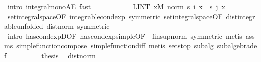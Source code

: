 \begin{isabellebody}
\ {\isacharparenleft}{\kern0pt}intro\ integral{\isacharunderscore}{\kern0pt}mono{\isacharunderscore}{\kern0pt}AE{\isacharcomma}{\kern0pt}\ fast{\isacharplus}{\kern0pt}{\isacharparenright}{\kern0pt}\isanewline
\ \ \ \ \ \ \isamarkupfalse%
\ \isamarkupfalse%
\ {\isachardoublequoteopen}{\isachardot}{\kern0pt}{\isachardot}{\kern0pt}{\isachardot}{\kern0pt}\ {\isacharequal}{\kern0pt}\ LINT\ x{\isacharbar}{\kern0pt}M{\isachardot}{\kern0pt}\ norm\ {\isacharparenleft}{\kern0pt}s\ i\ x\ {\isacharminus}{\kern0pt}\ s\ j\ x{\isacharparenright}{\kern0pt}{\isachardoublequoteclose}\ \isamarkupfalse%
\ set{\isacharunderscore}{\kern0pt}integral{\isacharunderscore}{\kern0pt}space{\isacharparenleft}{\kern0pt}{}{\isacharparenright}{\kern0pt}{\isacharbrackleft}{\kern0pt}OF\ integrable{\isacharunderscore}{\kern0pt}cond{\isacharunderscore}{\kern0pt}exp{\isacharcomma}{\kern0pt}\ symmetric{\isacharbrackright}{\kern0pt}\ set{\isacharunderscore}{\kern0pt}integral{\isacharunderscore}{\kern0pt}space{\isacharbrackleft}{\kern0pt}OF\ dist{\isacharunderscore}{\kern0pt}integrable{\isacharbrackleft}{\kern0pt}unfolded\ dist{\isacharunderscore}{\kern0pt}norm{\isacharbrackright}{\kern0pt}{\isacharcomma}{\kern0pt}\ symmetric{\isacharbrackright}{\kern0pt}\ \isamarkupfalse%
\ {\isacharparenleft}{\kern0pt}intro\ has{\isacharunderscore}{\kern0pt}cond{\isacharunderscore}{\kern0pt}expD{\isacharparenleft}{\kern0pt}{}{\isacharparenright}{\kern0pt}{\isacharbrackleft}{\kern0pt}OF\ has{\isacharunderscore}{\kern0pt}cond{\isacharunderscore}{\kern0pt}exp{\isacharunderscore}{\kern0pt}simple{\isacharbrackleft}{\kern0pt}OF\ {\isacharunderscore}{\kern0pt}\ fin{\isacharunderscore}{\kern0pt}sup{\isacharunderscore}{\kern0pt}norm{\isacharbrackright}{\kern0pt}{\isacharcomma}{\kern0pt}\ symmetric{\isacharbrackright}{\kern0pt}{\isacharparenright}{\kern0pt}\ {\isacharparenleft}{\kern0pt}metis\ assms{\isacharparenleft}{\kern0pt}{}{\isacharparenright}{\kern0pt}\ simple{\isacharunderscore}{\kern0pt}function{\isacharunderscore}{\kern0pt}compose{}\ simple{\isacharunderscore}{\kern0pt}function{\isacharunderscore}{\kern0pt}diff{\isacharcomma}{\kern0pt}\ metis\ sets{\isachardot}{\kern0pt}top\ subalg\ subalgebra{\isacharunderscore}{\kern0pt}def{\isacharparenright}{\kern0pt}\isanewline
\ \ \ \ \ \ \isamarkupfalse%
\ \isamarkupfalse%
\ {\isacharquery}{\kern0pt}thesis\ \isamarkupfalse%
\ dist{\isacharunderscore}{\kern0pt}norm\ \isacommand{{\isachardot}{\kern0pt}}\isamarkupfalse%

\end{isabellebody}
